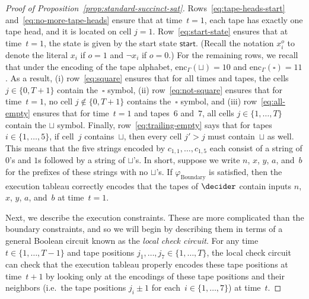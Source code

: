 \begin{proof}[Proof of Proposition~\ref{prop:standard-succinct-sat}]
  Rows~\eqref{eq:tape-heads-start} and~\eqref{eq:no-more-tape-heads} ensure that
  at time~$t = 1$, each tape has exactly one tape head, and it is located on
  cell $j = 1$.
  Row~\eqref{eq:start-state} ensures that at time~$t=1$, the state is given by
  the start state $\mathsf{start}$.
  (Recall the notation $x_i^o$ to denote the literal $x_i$ if $o = 1$ and $\neg
  x_i$ if $o = 0$.)
  For the remaining rows, we recall that under the encoding of the tape
  alphabet, $\mathrm{enc}_\Gamma(\sqcup) = 10$ and $\mathrm{enc}_\Gamma(\square)
  = 11$.
  As a result, (i) row~\eqref{eq:square} ensures that for all times and tapes,
  the cells $j \in \{0, T+1\}$ contain the~$\square$ symbol, (ii)
  row~\eqref{eq:not-square} ensures that for time~$t=1$, no cell $j \notin \{0,
  T+1\}$ contains the~$\square$ symbol, and (iii) row~\eqref{eq:all-empty}
  ensures that for time~$t=1$ and tapes~$6$ and~$7$, all cells $j \in \{1,
  \ldots, T\}$ contain the $\sqcup$ symbol.
  Finally, row~\eqref{eq:trailing-empty} says that for tapes $i \in \{1, \ldots,
  5\}$, if cell~$j$ contains~$\sqcup$, then every cell $j' > j$ must
  contain~$\sqcup$ as well.
  This means that the five strings encoded by $c_{1, 1}, \ldots, c_{1,5}$ each
  consist of a string of $0$'s and $1$s followed by a string of $\sqcup$'s.
  In short, suppose we write $n$, $x$, $y$, $a$, and~$b$ for the prefixes of
  these strings with no $\sqcup$'s.
  If $\varphi_{\mathrm{Boundary}}$ is satisfied, then the execution tableau
  correctly encodes that the tapes of $\decider$ contain inputs $n$, $x$, $y$,
  $a$, and~$b$ at time~$t=1$.

  Next, we describe the execution constraints.
  These are more complicated than the boundary constraints, and so we will begin
  by describing them in terms of a general Boolean circuit known as the
  \emph{local check circuit}.
  For any time~$t\in \{1, \ldots, T-1\}$ and tape positions $j_1, \ldots, j_7
  \in \{1, \ldots, T\}$, the local check circuit can check that the execution
  tableau properly encodes these tape positions at time~$t+1$ by looking only at
  the encodings of these tape positions and their neighbors (i.e.\ the tape
  positions $j_i \pm 1$ for each~$i \in \{1, \ldots, 7\}$) at time~$t$.


\end{proof}
